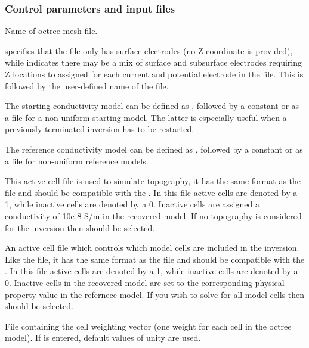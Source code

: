 \subsubsection{Control parameters and input files}
\begin{description}[leftmargin=5cm, style=sameline, align=left]
\item[\fileName{octree mesh}] Name of octree mesh file.
\item[\fileName{LOC\_XY(Z)}]  specifies that the  file only has surface electrodes (no Z coordinate is provided), while  indicates there may be a mix of surface and subsurface electrodes requiring Z locations to assigned for each current and potential electrode in the file. This is followed by the user-defined name of the  file.
\item[\fileName{initial model}] The starting conductivity model can be defined as , followed by a constant or as a  file for a non-uniform starting model. The latter is especially useful when a previously terminated inversion has to be restarted.
\item[\fileName{reference model}] The reference conductivity model can be defined as , followed by a constant or as a  file for non-uniform reference models. 
\item[\fileName{topography active cell}] This active cell file is used to simulate topography, it has the same format as the  file and should be compatible with the . In this file active cells are denoted by a 1, while inactive cells are denoted by a 0. Inactive cells are assigned a conductivity of 10e-8 S/m in the recovered model. If no topography is considered for the inversion then  should be selected. 
\item[\fileName{model active cell}] An active cell file which controls which model cells are included in the inversion. Like the  file, it has the same format as the  file and should be compatible with  the .  In this file active cells are denoted by a 1, while inactive cells are denoted by a 0. Inactive cells in the recovered model are set to the corresponding physical property value in the refernece model. If you wish to solve for all model cells then  should be selected.
\item[\fileName{cell weighting}] File containing the cell weighting vector (one weight for each cell in the octree model). If  is entered, default values of unity are used.

\end{description}
